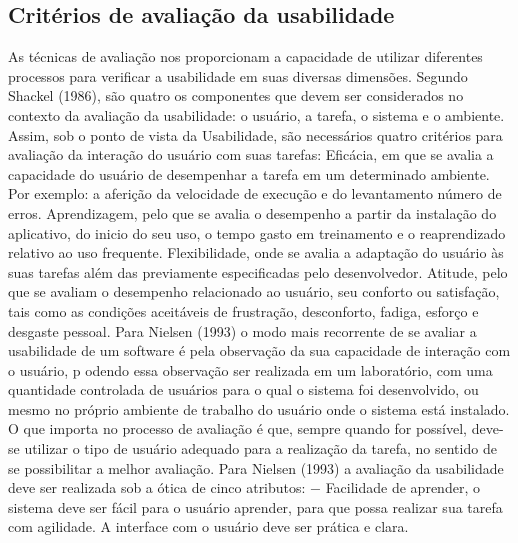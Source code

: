 \subsection{Critérios de avaliação da usabilidade} \label{Critérios de avaliação da usabilidade}

As técnicas de avaliação nos proporcionam a capacidade de utilizar diferentes processos para verificar a usabilidade em suas diversas dimensões.\newline
\indent Segundo Shackel (1986), são quatro os componentes que devem ser considerados no contexto da avaliação da usabilidade: o usuário, a tarefa, o sistema e o ambiente. Assim, sob o ponto de vista da Usabilidade, são necessários quatro critérios para avaliação da interação do usuário com suas tarefas:\newline
\indent Eficácia, em que se avalia a capacidade do usuário de desempenhar a tarefa em um determinado ambiente. Por exemplo: a aferição da velocidade de execução e do levantamento número de erros. \newline
\indent Aprendizagem, pelo que se avalia o desempenho a partir da instalação do aplicativo, do inicio do seu uso, o tempo gasto em treinamento e o reaprendizado relativo ao uso frequente. \newline
\indent Flexibilidade, onde se avalia a adaptação do usuário às suas tarefas além das previamente especificadas pelo desenvolvedor. \newline
\indent Atitude, pelo que se avaliam o desempenho relacionado ao usuário, seu conforto ou satisfação, tais como as condições aceitáveis de frustração, desconforto, fadiga, esforço e desgaste pessoal.\newline
\indent Para Nielsen (1993) o modo mais recorrente de se avaliar a usabilidade de um software é pela observação da sua capacidade de interação com o usuário, p odendo essa observação ser realizada em um laboratório, com uma quantidade controlada de usuários para o qual o sistema foi desenvolvido, ou mesmo no próprio ambiente de trabalho do usuário onde o sistema está instalado. O que importa no processo de avaliação é que, sempre quando for possível, deve-se utilizar o tipo de usuário adequado para a realização da tarefa, no sentido de se possibilitar a melhor avaliação.\newline
\indent Para Nielsen (1993) a avaliação da usabilidade deve ser realizada sob a ótica de cinco atributos:\newline
\indent − Facilidade de aprender, o sistema deve ser fácil para o usuário aprender, para que possa realizar sua tarefa com agilidade. A interface com o usuário deve ser prática e clara. \newline

